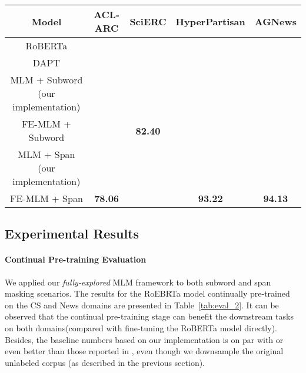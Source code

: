 \documentclass{article} \usepackage{iclr2021_conference,times}
\newcommand{\tf}[1]{\textbf{#1}}
\theoremstyle{plain}
\begin{document}
\begin{table*}[ht!]
	\centering
	\begin{small}
		\vspace{0mm}
		\setlength{\tabcolsep}{5pt}
		\def\arraystretch{1.0}
		\begin{tabular}{c||c|c|c|c}
			\toprule[1.2pt]
			\tf{Model} & \tf{ACL-ARC} & \tf{SciERC}    & \tf{HyperPartisan} & \tf{AGNews} \\
			\hline
RoBERTa \citep{gururangan2020don}  &  &  &  &  \\
			DAPT \citep{gururangan2020don}  &  &  &  &   \\
			\hline
			MLM + Subword (our implementation) &  &  &  &  \\
			FE-MLM + Subword &  & \tf{82.40} &  &  \\
			\hline
			MLM + Span (our implementation) &  &  &  &   \\
			FE-MLM + Span & \tf{78.06} &  & \tf{93.22}  &  \tf{94.13} \\
			\bottomrule[1.2pt]
		\end{tabular}\caption{The empirical results on continual pre-training setting, where RoBERTa and DAPT (RoBERTa continually pre-trained with the standard MLM objective) is leveraged as our baseline to facilitate comparison with \citep{gururangan2020don}. Specifically, ACL-ARC and SciERC are evaluated with the continually pre-trained model with CS domain corpus, while HyperPartisann and AGNews are based upon models trained with News domain corpus.}
		\label{tab:eval_2}
	\end{small}
	\vspace{-2mm}
\end{table*}
\vspace{-1mm}
\subsection{Experimental Results}
\vspace{-2mm}
\paragraph{Continual Pre-training Evaluation}  We applied our \emph{fully-explored} MLM framework to both subword and span masking scenarios.
The results for the RoEBRTa model continually pre-trained on the CS and News domains are presented in Table~\ref{tab:eval_2}.
It can be observed that the continual pre-training stage can benefit the downstream tasks on both domains(compared with fine-tuning the RoBERTa model directly).
Besides, the baseline numbers based on our implementation is on par with or even better than those reported in \cite{gururangan2020don}, even though we downsample the original unlabeled corpus (as described in the previous section). 
\end{document}
